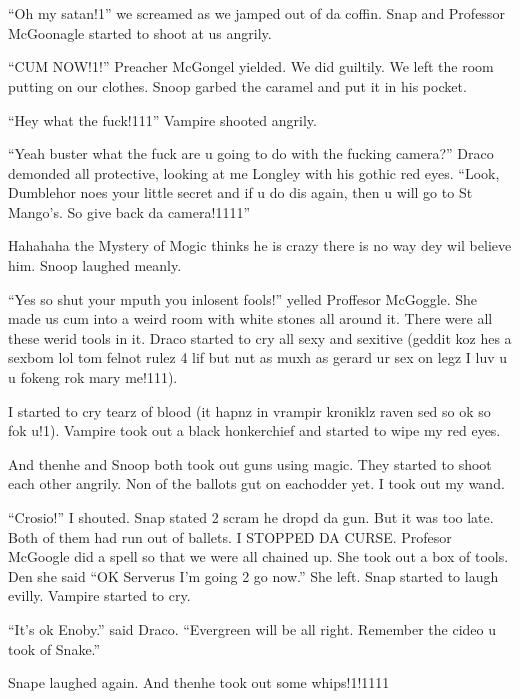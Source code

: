 \section{\chaptername~\thesection}



\enquote{Oh my satan!1} we screamed as we jamped out of da coffin. Snap and Professor McGoonagle started to shoot at us angrily.

\enquote{CUM NOW!1!} Preacher McGongel yielded. We did guiltily. We left the room putting on our clothes. Snoop garbed the caramel and put it in his pocket.

\enquote{Hey what the fuck!111} Vampire shooted angrily.

\enquote{Yeah buster what the fuck are u going to do with the fucking camera?} Draco demonded all protective, looking at me Longley with his gothic red eyes. \enquote{Look, Dumblehor noes your little secret and if u do dis again, then u will go to St Mango's. So give back da camera!1111}

Hahahaha the Mystery of Mogic thinks he is crazy there is no way dey wil believe him. Snoop laughed meanly.

\enquote{Yes so shut your mputh you inlosent fools!} yelled Proffesor McGoggle. She made us cum into a weird room with white stones all around it. There were all these werid tools in it. Draco started to cry all sexy and sexitive (geddit koz hes a sexbom lol tom felnot rulez 4 lif but nut as muxh as gerard ur sex on legz I luv u u fokeng rok mary me!111).

I started to cry tearz of blood (it hapnz in vrampir kroniklz raven sed so ok so fok u!1). Vampire took out a black honkerchief and started to wipe my red eyes.

And then\dotfill\newline he and Snoop both took out guns using magic. They started to shoot each other angrily. Non of the ballots gut on eachodder yet. I took out my wand.

\enquote{Crosio!} I shouted. Snap stated 2 scram he dropd da gun. But it was too late. Both of them had run out of ballets. I STOPPED DA CURSE\@. Profesor McGoogle did a spell so that we were all chained up. She took out a box of tools. Den she said \enquote{OK Serverus I'm going 2 go now.} She left. Snap started to laugh evilly. Vampire started to cry.

\enquote{It's ok Enoby.} said Draco. \enquote{Evergreen will be all right. Remember the cideo u took of Snake.}

Snape laughed again. And then\dotfill\newline he took out some whips!1!1111
